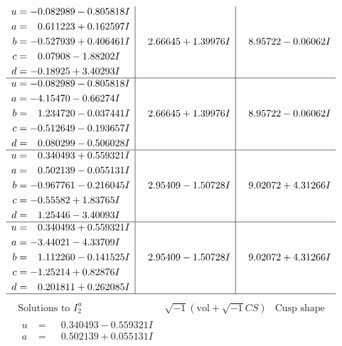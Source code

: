 \documentclass[1p]{elsarticle_modified}
\theoremstyle{definition}
\newcommand{\I}{\sqrt{-1}}
\begin{document}
$$\begin{array}{c|c|c}
\begin{aligned}
u &= -0.082989 - 0.805818 I \\
a &= \phantom{-}0.611223 + 0.162597 I \\
b &= -0.527939 + 0.406461 I \\
c &= \phantom{-}0.07908 - 1.88202 I \\
d &= -0.18925 + 3.40293 I\end{aligned}
 & \phantom{-}2.66645 + 1.39976 I & \phantom{-}8.95722 - 0.06062 I \\ \hline\begin{aligned}
u &= -0.082989 - 0.805818 I \\
a &= -4.15470 - 0.66274 I \\
b &= \phantom{-}1.234720 - 0.037441 I \\
c &= -0.512649 - 0.193657 I \\
d &= \phantom{-}0.080299 - 0.506028 I\end{aligned}
 & \phantom{-}2.66645 + 1.39976 I & \phantom{-}8.95722 - 0.06062 I \\ \hline\begin{aligned}
u &= \phantom{-}0.340493 + 0.559321 I \\
a &= \phantom{-}0.502139 - 0.055131 I \\
b &= -0.967761 - 0.216045 I \\
c &= -0.55582 + 1.83765 I \\
d &= \phantom{-}1.25446 - 3.40093 I\end{aligned}
 & \phantom{-}2.95409 - 1.50728 I & \phantom{-}9.02072 + 4.31266 I \\ \hline\begin{aligned}
u &= \phantom{-}0.340493 + 0.559321 I \\
a &= -3.44021 - 4.33709 I \\
b &= \phantom{-}1.112260 - 0.141525 I \\
c &= -1.25214 + 0.82876 I \\
d &= \phantom{-}0.201811 + 0.262085 I\end{aligned}
 & \phantom{-}2.95409 - 1.50728 I & \phantom{-}9.02072 + 4.31266 I\\
 \hline 
 \end{array}$$\newpage$$\begin{array}{c|c|c}  
\text{Solutions to }I^u_{2}& \I (\text{vol} + \sqrt{-1}CS) & \text{Cusp shape}\\
 \hline 
\begin{aligned}
u &= \phantom{-}0.340493 - 0.559321 I \\
a &= \phantom{-}0.502139 + 0.055131 I \\

\end{aligned}
\end{array}$$
\end{document}
